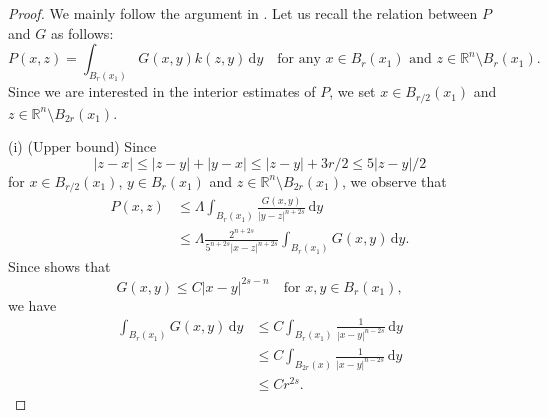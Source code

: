 \documentclass[11pt]{amsart}
\theoremstyle{plain}
\theoremstyle{definition}
\numberwithin{equation}{section}
\begin{document}
    \begin{proof}
        We mainly follow the argument in \cite[Section~3]{CS98}. Let us recall the relation between $P$ and $G$ as follows:
        \begin{equation*}
        P(x, z)=\int_{B_r(x_1)}G(x, y)k(z, y)\,\mathrm{d}y \quad \text{for any $x \in B_r(x_1)$ and $z \in \mathbb{R}^n \setminus B_r(x_1)$}.
    \end{equation*}
    Since we are interested in the interior estimates of $P$, we set $x \in B_{r/2}(x_1)$ and $z \in \mathbb{R}^n \setminus B_{2r}(x_1)$.\newline

    (i) (Upper bound) 
     Since
     \begin{equation*}
        |z-x|\leq |z-y|+|y-x| \leq |z-y|+3r/2 \leq 5|z-y|/2 
    \end{equation*}
    for $x \in B_{r/2}(x_1)$, $y \in B_r(x_1)$ and $z \in \mathbb{R}^n \setminus B_{2r}(x_1)$, we observe that
    \begin{equation*}
        \begin{aligned}
            P(x, z) &\leq \Lambda\int_{B_r(x_1)}\frac{G(x, y)}{|y-z|^{n+2s}}\,\mathrm{d}y \\
            &\leq \Lambda\frac{2^{n+2s}}{5^{n+2s}|x-z|^{n+2s}}\int_{B_r(x_1)}G(x, y)\,\mathrm{d}y.
        \end{aligned}
    \end{equation*}
    Since  shows that
    \begin{equation*}
        G(x, y) \leq C|x-y|^{2s-n}  \quad \text{for $x, y \in B_r(x_1)$},
    \end{equation*}
    we have
    \begin{equation*}
        \begin{aligned}
            \int_{B_r(x_1)} G(x, y) \,\mathrm{d}y &\leq C\int_{B_r(x_1)}\frac{1}{|x-y|^{n-2s}} \,\mathrm{d}y\\
            &\leq C\int_{B_{2r}(x)}\frac{1}{|x-y|^{n-2s}} \,\mathrm{d}y\\
            &\leq Cr^{2s}.
        \end{aligned}
    \end{equation*}


\end{proof}
\end{document}
